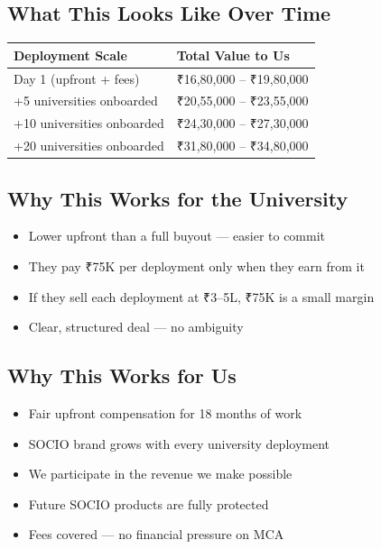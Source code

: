\documentclass[12pt,a4paper]{article}
\begin{document}
    \vspace{0.4cm}

    \subsection*{What This Looks Like Over Time}

    \begin{tabularx}{\textwidth}{L{5cm} X}
    \toprule
    \textbf{Deployment Scale} & \textbf{Total Value to Us} \\
    \midrule
    Day 1 (upfront + fees) & ₹16,80,000 – ₹19,80,000 \\
    +5 universities onboarded & ₹20,55,000 – ₹23,55,000 \\
    +10 universities onboarded & ₹24,30,000 – ₹27,30,000 \\
    +20 universities onboarded & ₹31,80,000 – ₹34,80,000 \\
    \bottomrule
    \end{tabularx}

    \vspace{0.4cm}

    \subsection*{Why This Works for the University}

    \begin{itemize}[leftmargin=*, noitemsep]
        \item Lower upfront than a full buyout — easier to commit
        \item They pay ₹75K per deployment only when they earn from it
        \item If they sell each deployment at ₹3–5L, ₹75K is a small margin
        \item Clear, structured deal — no ambiguity
    \end{itemize}

    \subsection*{Why This Works for Us}

    \begin{itemize}[leftmargin=*, noitemsep]
        \item Fair upfront compensation for 18 months of work
        \item SOCIO brand grows with every university deployment
        \item We participate in the revenue we make possible
        \item Future SOCIO products are fully protected
        \item Fees covered — no financial pressure on MCA
    \end{itemize}
\end{document}
